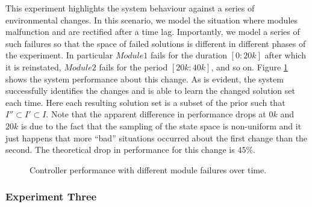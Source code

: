 This experiment highlights the system behaviour against a series of environmental changes. In this scenario, we model the situation where modules malfunction and are rectified after a time lag. Importantly, we model a series of such failures so that the space of failed solutions is different in different phases of the experiment. In particular $Module1$ fails for the duration $[0:20k]$ after which it is reinstated, $Module2$ fails for the period $[20k:40k]$, and so on. Figure \ref{fig:experiment2} shows the system performance about this change. As is evident, the system successfully identifies the changes and is able to learn the changed solution set each time. Here each resulting solution set is a subset of the prior such that $I'' \subset I' \subset I$. Note that the apparent difference in performance drops at $0k$ and $20k$ is due to the fact that the sampling of the state space is non-uniform and it just happens that more ``bad'' situations occurred about the first change than the second. The theoretical drop in performance for this change is $45\%$. 

\begin{figure}[ht]
\begin{center}

\end{center}
\caption{Controller performance with different module failures over time.}
\label{fig:experiment2}
\end{figure}

\subsubsection{Experiment Three}


